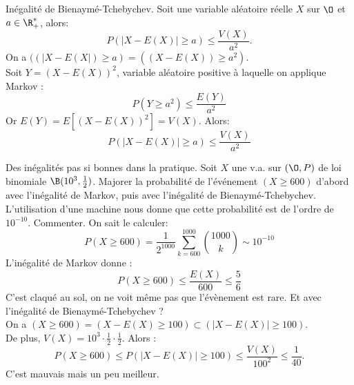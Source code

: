 \documentclass[11pt]{article}
\begin{document}
\pagebreak

\begin{prop}{Inégalité de Bienaymé-Tchebychev.}{}
    Soit une variable aléatoire réelle $X$ sur $\O$ et $a\in\R^*_+$, alors:
    \begin{equation*}
        P(|X-E(X)|\geq a)\leq\frac{V(X)}{a^2}.
    \end{equation*}
    \tcblower
    On a $((|X-E(X|)\geq a) = ((X-E(X))\geq a^2)$.\\
    Soit $Y=(X-E(X))^2$, variable aléatoire positive à laquelle on applique Markov :
    \begin{equation*}
        P(Y\geq a^2) \leq \frac{E(Y)}{a^2}
    \end{equation*}
    Or $E(Y)=E\left[ (X-E(X))^2 \right]=V(X).$ Alors:
    \begin{equation*}
        P(|X-E(X)|\geq a)\leq\frac{V(X)}{a^2}
    \end{equation*}
\end{prop}

\begin{ex}{Des inégalités pas si bonnes dans la pratique.}{}
    Soit $X$ une v.a. sur $(\O,P)$ de loi binomiale $\B(10^3,\frac{1}{2})$. Majorer la probabilité de l'événement $(X\geq600)$ d'abord avec l'inégalité de Markov, puis avec l'inégalité de Bienaymé-Tchebychev. L'utilisation d'une machine nous donne que cette probabilité est de l'ordre de $10^{-10}$. Commenter.
    \tcblower
    On sait le calculer:
    \begin{equation*}
        P(X\geq600)=\frac{1}{2^{1000}}\sum_{k=600}^{1000}\binom{1000}{k}\sim 10^{-10}
    \end{equation*}
    L'inégalité de Markov donne :
    \begin{equation*}
        P(X\geq600)\leq\frac{E(X)}{600}\leq\frac{5}{6}
    \end{equation*}
    C'est claqué au sol, on ne voit même pas que l'évènement est rare.\n
    Et avec l'inégalité de Bienaymé-Tchebychev ?\\
    On a $(X\geq600)=(X-E(X)\geq100)\subset(|X-E(X)|\geq100)$.\\
    De plus, $V(X)=10^3\cdot\frac{1}{2}\cdot\frac{1}{2}$. Alors :
    \begin{equation*}
        P(X\geq600)\leq P(|X-E(X)|\geq100) \leq \frac{V(X)}{100^2}\leq\frac{1}{40}.
    \end{equation*}
    C'est mauvais mais un peu meilleur.
\end{ex}
\end{document}
